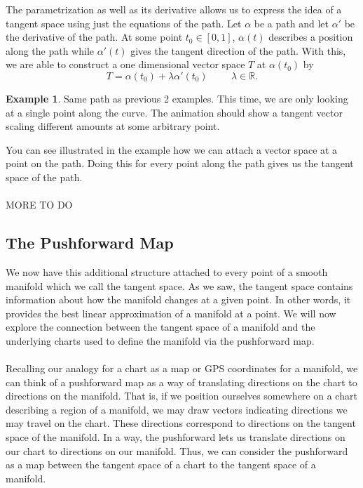 \documentclass[]{article}
\newcommand\<{\ensuremath{\left\langle}}
\renewcommand\>{\ensuremath{\right\rangle}}
\newcommand{\RR}{\ensuremath{\mathbb{R}}}
\theoremstyle{definition}
\theoremstyle{definition}
\newtheorem{example}{Example}[section]
\begin{document}
	The parametrization as well as its derivative allows us to express the idea of a tangent space using just the equations of the path. Let $\alpha$ be a path and let $\alpha'$ be the derivative of the path. At some point $t_0 \in [0,1]$, $\alpha(t)$ describes a position along the path while $\alpha'(t)$ gives the tangent direction of the path. With this, we are able to construct a one dimensional vector space $T$ at $\alpha(t_0)$ by
	$$
		T = \alpha(t_0) + \lambda\alpha'(t_0) \hspace{1cm} \lambda \in \RR.
	$$
	\begin{example}
		Same path as previous 2 examples. This time, we are only looking at a single point along the curve. The animation should show a tangent vector scaling different amounts at some arbitrary point.
	\end{example}
	You can see illustrated in the example how we can attach a vector space at a point on the path. Doing this for every point along the path gives us the tangent space of the path.\\
	\\
	MORE TO DO
	
	
	\subsection*{The Pushforward Map}
	We now have this additional structure attached to every point of a smooth manifold which we call the tangent space. As we saw, the tangent space contains information about how the manifold changes at a given point. In other words, it provides the best linear approximation of a manifold at a point. We will now explore the connection between the tangent space of a manifold and the underlying charts used to define the manifold via the pushforward map. \\
	\\
	Recalling our analogy for a chart as a map or GPS coordinates for a manifold, we can think of a pushforward map as a way of translating directions on the chart to directions on the manifold. That is, if we position ourselves somewhere on a chart describing a region of a manifold, we may draw vectors indicating directions we may travel on the chart. These directions correspond to directions on the tangent space of the manifold. In a way, the pushforward lets us translate directions on our chart to directions on our manifold. Thus, we can consider the pushforward as a map between the tangent space of a chart to the tangent space of a manifold.
	
\end{document}
